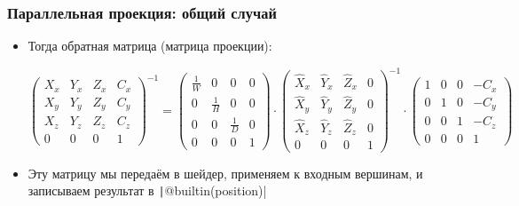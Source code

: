 \documentclass[10pt]{beamer}
\begin{document}
\begin{frame}[fragile]
\frametitle{Параллельная проекция: общий случай}
\begin{itemize}
\item Тогда обратная матрица (матрица проекции):
\begin{center}
\begin{math}
\begin{pmatrix}
X_x & Y_x & Z_x & C_x \\
X_y & Y_y & Z_y & C_y \\
X_z & Y_z & Z_z & C_z \\
0 & 0 & 0 & 1
\end{pmatrix}^{-1}
=
\begin{pmatrix}
\frac{1}{W} & 0 & 0 & 0 \\
0 & \frac{1}{H} & 0 & 0 \\
0 & 0 & \frac{1}{D} & 0 \\
0 & 0 & 0 & 1
\end{pmatrix}
\cdot
\begin{pmatrix}
\hat X_x & \hat Y_x & \hat Z_x & 0 \\
\hat X_y & \hat Y_y & \hat Z_y & 0 \\
\hat X_z & \hat Y_z & \hat Z_z & 0 \\
0 & 0 & 0 & 1
\end{pmatrix}^{-1}
\cdot
\begin{pmatrix}
1 & 0 & 0 & -C_x \\
0 & 1 & 0 & -C_y \\
0 & 0 & 1 & -C_z \\
0 & 0 & 0 & 1
\end{pmatrix}
\end{math}
\end{center}
\pause
\item Эту матрицу мы передаём в шейдер, применяем к входным вершинам, и записываем результат в \texttt|@builtin(position)|
\end{itemize}
\end{frame}
\end{document}
